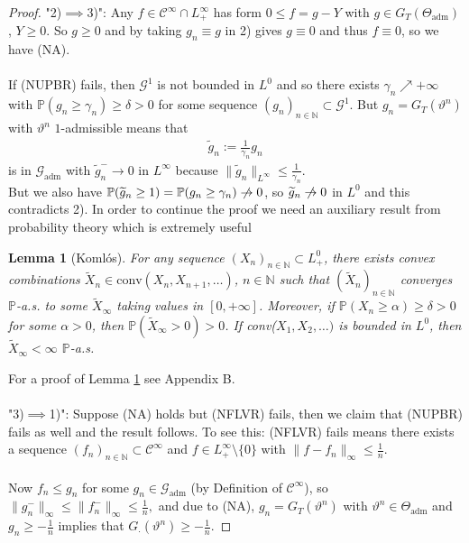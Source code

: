 \documentclass[12pt,a4paper, twoside]{article}
\newtheorem{lem}{Lemma}[section]
\theoremstyle{definition}
\newcommand{\PP}{\mathbb{P}} %
\begin{document}
\begin{proof}
"2)$\implies$3)": Any $f \in \mathcal{C}^\infty \cap L_+^\infty$ has form $0 \leq f= g-Y$ with $g \in G_T( \Theta_\text{adm})$, $Y \geq 0$. So $g \geq 0$ and by taking $g_n \equiv g$ in 2) gives $g \equiv 0$ and thus $f \equiv 0$, so we have (NA). \\
\\
If (NUPBR) fails, then $\mathcal{G}^1$ is not bounded in $L^0$ and so there exists $ \gamma_n \nearrow + \infty$ with $\PP(g_n \geq \gamma_n) \geq \delta >0$ for some sequence $(g_n)_{n \in \mathbb{N}} \subset \mathcal{G}^1$. But $g_n = G_T( \vartheta^n)$ with $\vartheta^n$ $1$-admissible means that  
\begin{align*}
\widetilde{g}_n:= \frac{1}{\gamma_n}g_n
\end{align*}
is in $\mathcal{G}_\text{adm}$ with $\widetilde{g}_n^- \to 0$ in $L^\infty$ because $\| \widetilde{g}_n \|_{L^\infty} \leq \frac{1}{\gamma_n}$. \\ But we also have $\PP( \widetilde{g}_n \geq 1) = \PP(g_n \geq \gamma_n) \centernot\to 0$, so $\widetilde{g}_n \centernot\to 0$ in $L^0$ and this contradicts 2). 
\newpage
In order to continue the proof we need an auxiliary result from probability theory which is extremely useful
\begin{lem}[Komlós]\label{L44} For any sequence $(X_n)_{n \in \mathbb{N}} \subset L_+^0$, there exists convex combinations $\widetilde{X}_n \in \text{conv}(X_n,X_{n+1}, \dots )$, $n \in \mathbb{N}$ such that $(\widetilde{X}_n)_{n \in \mathbb{N}}$ converges $\PP$-a.s. to some $\widetilde{X}_\infty$ taking values in $[0, + \infty]$. Moreover, if $\PP( X_n \geq \alpha) \geq \delta > 0$ for some $\alpha >0$, then $\PP( \widetilde{X}_\infty >0 ) >0$. If conv($X_1, X_2, \dots )$ is bounded in $L^0$, then $\widetilde{X}_\infty < \infty$ $\PP$-a.s. 
\end{lem}
For a proof of Lemma \ref{L44} see Appendix B.
\\
\\
"3)$\implies$1)": Suppose (NA) holds but (NFLVR) fails, then we claim that (NUPBR) fails as well and the result follows. To see this: (NFLVR) fails means there exists a sequence $(f_n)_{n \in \mathbb{N}} \subset \mathcal{C}^\infty$ and $f \in L_+^\infty \setminus \{0\}$ with $\|f-f_n\|_\infty \leq \frac{1}{n}$. \\
\\
Now $f_n \leq g_n$ for some $g_n \in \mathcal{G}_\text{adm}$ (by Definition of $\mathcal{C}^\infty$), so $\|g_n^-\|_\infty \leq \|f_n^-\|_\infty \leq \frac{1}{n},$ and due to (NA), $g_n = G_T( \vartheta^n)$ with $\vartheta^n \in \Theta_\text{adm}$ and $g_n \geq - \frac{1}{n}$ implies that $G_\cdot ( \vartheta^n) \geq - \frac{1}{n}$. 

\end{proof}
\end{document}
